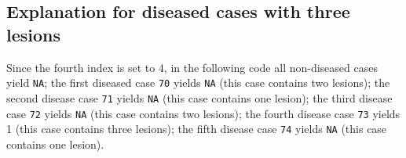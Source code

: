 \documentclass[
]{book}
\newenvironment{Shaded}{\begin{snugshade}}{\end{snugshade}}
\newcommand{\CommentTok}[1]{\textcolor[rgb]{0.56,0.35,0.01}{\textit{#1}}}
\newcommand{\DecValTok}[1]{\textcolor[rgb]{0.00,0.00,0.81}{#1}}
\newcommand{\KeywordTok}[1]{\textcolor[rgb]{0.13,0.29,0.53}{\textbf{#1}}}
\newcommand{\NormalTok}[1]{#1}
\newcommand{\OperatorTok}[1]{\textcolor[rgb]{0.81,0.36,0.00}{\textbf{#1}}}
\newcommand{\StringTok}[1]{\textcolor[rgb]{0.31,0.60,0.02}{#1}}
\begin{document}
\begin{Shaded}
\end{Shaded}

\hypertarget{explanation-for-diseased-cases-with-three-lesions}{%
\subsection{Explanation for diseased cases with three lesions}\label{explanation-for-diseased-cases-with-three-lesions}}

Since the fourth index is set to 4, in the following code all non-diseased cases yield \texttt{NA}; the first diseased case \texttt{70} yields \texttt{NA} (this case contains two lesions); the second disease case \texttt{71} yields \texttt{NA} (this case contains one lesion); the third disease case \texttt{72} yields \texttt{NA} (this case contains two lesions); the fourth disease case \texttt{73} yields 1 (this case contains three lesions); the fifth disease case \texttt{74} yields \texttt{NA} (this case contains one lesion).
\end{document}
